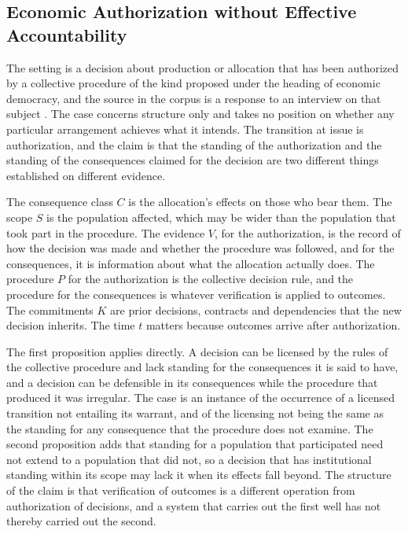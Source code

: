 \subsection{Economic Authorization without Effective Accountability}

The setting is a decision about production or allocation that has been authorized by a collective procedure of the kind proposed under the heading of economic democracy, and the source in the corpus is a response to an interview on that subject \cite{authz}. The case concerns structure only and takes no position on whether any particular arrangement achieves what it intends. The transition at issue is authorization, and the claim is that the standing of the authorization and the standing of the consequences claimed for the decision are two different things established on different evidence.

The consequence class $C$ is the allocation's effects on those who bear them. The scope $S$ is the population affected, which may be wider than the population that took part in the procedure. The evidence $V$, for the authorization, is the record of how the decision was made and whether the procedure was followed, and for the consequences, it is information about what the allocation actually does. The procedure $P$ for the authorization is the collective decision rule, and the procedure for the consequences is whatever verification is applied to outcomes. The commitments $K$ are prior decisions, contracts and dependencies that the new decision inherits. The time $t$ matters because outcomes arrive after authorization.

The first proposition applies directly. A decision can be licensed by the rules of the collective procedure and lack standing for the consequences it is said to have, and a decision can be defensible in its consequences while the procedure that produced it was irregular. The case is an instance of the occurrence of a licensed transition not entailing its warrant, and of the licensing not being the same as the standing for any consequence that the procedure does not examine. The second proposition adds that standing for a population that participated need not extend to a population that did not, so a decision that has institutional standing within its scope may lack it when its effects fall beyond. The structure of the claim is that verification of outcomes is a different operation from authorization of decisions, and a system that carries out the first well has not thereby carried out the second.

